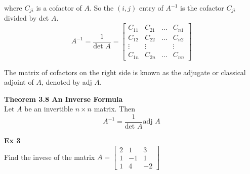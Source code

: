\documentclass{article}
\begin{document}
  where $ C_{ji} $ is a cofactor of $ A $. So the $ (i,j) $ entry of $ A^{-1} $ is the cofactor $ C_{ji} $ divided by det $ A $. 
  \[
    A^{-1}=\frac{1}{\text{det }A}=
    \begin{bmatrix}
    C_{11} &C_{21} &... &C_{n1}\\
    C_{12} &C_{22} &... &C_{n2}\\
    \vdots &\vdots & &\vdots\\
    C_{1n} &C_{2n} &... &C_{nn}
    \end{bmatrix}
  \]

  The matrix of cofactors on the right side is known as the adjugate or classical adjoint of $ A $, denoted by adj $ A $.

  \textbf{Theorem 3.8 An Inverse Formula}\\
  Let $ A $ be an invertible $ n \times n $ matrix. Then
  \[
    A^{-1}=\frac{1}{\text{det }A}\text{adj }A
  \]
  
  \textbf{Ex 3}\\
  Find the invese of the matrix $ A = \begin{bmatrix}
    2 &1 &3\\
    1 &-1 &1\\
    1 &4 &-2
  \end{bmatrix} $ 
 
\end{document}
